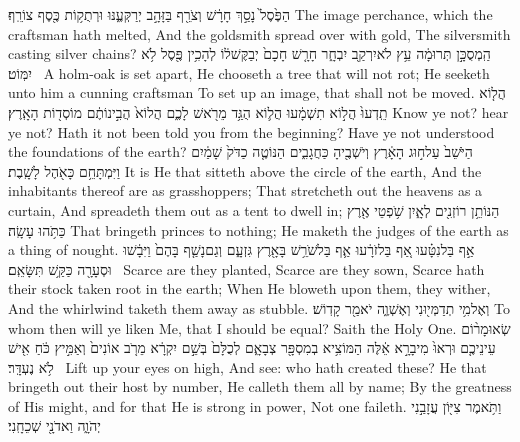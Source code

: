 {הַפֶּ֙סֶל֙ נָסַ֣ךְ חָרָ֔שׁ וְצֹרֵ֖ף בַּזָּהָ֣ב יְרַקְּעֶ֑נּוּ וּרְתֻק֥וֹת כֶּ֖סֶף צוֹרֵֽף׃}
{The image perchance, which the craftsman hath melted, And the goldsmith spread over with gold, The silversmith casting silver chains?}
{הַֽמְסֻכָּ֣ן תְּרוּמָ֔ה עֵ֥ץ לֹא\maqqaf יִרְקַ֖ב יִבְחָ֑ר חָרָ֤שׁ חָכָם֙ יְבַקֶּשׁ\maqqaf ל֔וֹ לְהָכִ֥ין פֶּ֖סֶל לֹ֥א יִמּֽוֹט׃ \setuma }
{A holm-oak is set apart, He chooseth a tree that will not rot; He seeketh unto him a cunning craftsman To set up an image, that shall not be moved.}
{הֲל֤וֹא תֵֽדְעוּ֙ הֲל֣וֹא תִשְׁמָ֔עוּ הֲל֛וֹא הֻגַּ֥ד מֵרֹ֖אשׁ לָכֶ֑ם הֲלוֹא֙ הֲבִ֣ינוֹתֶ֔ם מוֹסְד֖וֹת הָאָֽרֶץ׃}
{Know ye not? hear ye not? Hath it not been told you from the beginning? Have ye not understood the foundations of the earth?}
{הַיֹּשֵׁב֙ עַל\maqqaf ח֣וּג הָאָ֔רֶץ וְיֹשְׁבֶ֖יהָ כַּחֲגָבִ֑ים הַנּוֹטֶ֤ה כַדֹּק֙ שָׁמַ֔יִם וַיִּמְתָּחֵ֥ם כָּאֹ֖הֶל לָשָֽׁבֶת׃}
{It is He that sitteth above the circle of the earth, And the inhabitants thereof are as grasshoppers; That stretcheth out the heavens as a curtain, And spreadeth them out as a tent to dwell in;}
{הַנּוֹתֵ֥ן רוֹזְנִ֖ים לְאָ֑יִן שֹׁ֥פְטֵי אֶ֖רֶץ כַּתֹּ֥הוּ עָשָֽׂה׃}
{That bringeth princes to nothing; He maketh the judges of the earth as a thing of nought.}
{אַ֣ף בַּל\maqqaf נִטָּ֗עוּ אַ֚ף בַּל\maqqaf זֹרָ֔עוּ אַ֛ף בַּל\maqqaf שֹׁרֵ֥שׁ בָּאָ֖רֶץ גִּזְעָ֑ם וְגַם\maqqaf נָשַׁ֤ף בָּהֶם֙ וַיִּבָ֔שׁוּ וּסְעָרָ֖ה כַּקַּ֥שׁ תִּשָּׂאֵֽם׃ \setuma }
{Scarce are they planted, Scarce are they sown, Scarce hath their stock taken root in the earth; When He bloweth upon them, they wither, And the whirlwind taketh them away as stubble.}
{וְאֶל\maqqaf מִ֥י תְדַמְּי֖וּנִי וְאֶשְׁוֶ֑ה יֹאמַ֖ר קָדֽוֹשׁ׃}
{To whom then will ye liken Me, that I should be equal? Saith the Holy One.}
{שְׂאוּ\maqqaf מָר֨וֹם עֵינֵיכֶ֤ם וּרְאוּ֙ מִי\maqqaf בָרָ֣א אֵ֔לֶּה הַמּוֹצִ֥יא בְמִסְפָּ֖ר צְבָאָ֑ם לְכֻלָּם֙ בְּשֵׁ֣ם יִקְרָ֔א מֵרֹ֤ב אוֹנִים֙ וְאַמִּ֣יץ כֹּ֔חַ אִ֖ישׁ לֹ֥א נֶעְדָּֽר׃ \setuma }
{Lift up your eyes on high, And see: who hath created these? He that bringeth out their host by number, He calleth them all by name; By the greatness of His might, and for that He is strong in power, Not one faileth.}
\label{haft_46}
\setcounter{chap}{49}
\setcounter{verse}{14}
{וַתֹּ֥אמֶר צִיּ֖וֹן עֲזָבַ֣נִי יְהֹוָ֑ה וַאדֹנָ֖י שְׁכֵחָֽנִי׃}
